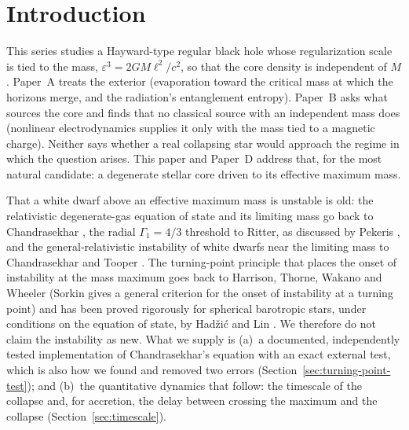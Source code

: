 \documentclass[11pt]{article}
\begin{document}
\section{Introduction}
\label{sec:intro}

This series studies a Hayward-type regular black hole whose regularization scale is tied to the mass, $\varepsilon^3=2GM\ell^2/c^2$, so that the core density is independent of $M$. Paper~A \citep{PaperA} treats the exterior (evaporation toward the critical mass at which the horizons merge, and the radiation's entanglement entropy). Paper~B \citep{PaperB} asks what sources the core and finds that no classical source with an independent mass does (nonlinear electrodynamics supplies it only with the mass tied to a magnetic charge). Neither says whether a real collapsing star would approach the regime in which the question arises. This paper and Paper~D \citep{PaperD} address that, for the most natural candidate: a degenerate stellar core driven to its effective maximum mass.

That a white dwarf above an effective maximum mass is unstable is old: the relativistic degenerate-gas equation of state and its limiting mass go back to Chandrasekhar \citep{Chandrasekhar1935}, the radial $\Gamma_1=4/3$ threshold to Ritter, as discussed by Pekeris \citep{Pekeris1938}, and the general-relativistic instability of white dwarfs near the limiting mass to Chandrasekhar and Tooper \citep{ChandrasekharTooper1964}. The turning-point principle that places the onset of instability at the mass maximum goes back to Harrison, Thorne, Wakano and Wheeler \citep{HTWW1965} (Sorkin \citep{Sorkin1981} gives a general criterion for the onset of instability at a turning point) and has been proved rigorously for spherical barotropic stars, under conditions on the equation of state, by Had\v{z}i\'c and Lin \citep{HadzicLin2021}. We therefore do not claim the instability as new. What we supply is (a)~a documented, independently tested implementation of Chandrasekhar's equation with an exact external test, which is also how we found and removed two errors (Section~\ref{sec:turning-point-test}); and (b)~the quantitative dynamics that follow: the timescale of the collapse and, for accretion, the delay between crossing the maximum and the collapse (Section~\ref{sec:timescale}).
\end{document}
